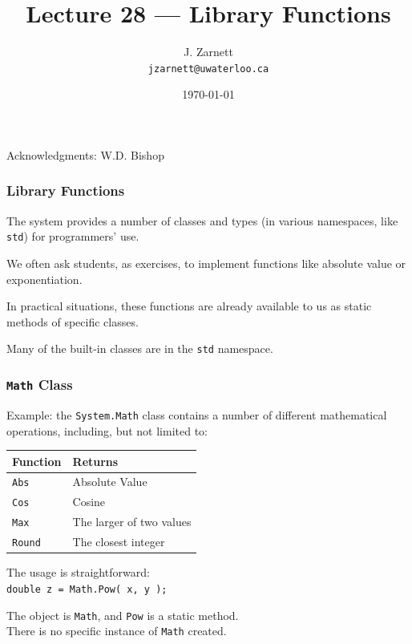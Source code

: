 

\title{Lecture 28 --- Library Functions }

\author{J. Zarnett\\
\texttt{jzarnett@uwaterloo.ca}}
\date{\today}



\begin{frame}
  \titlepage
  
  \begin{center}
  \small{Acknowledgments: W.D. Bishop}
  \end{center}
\end{frame}


\begin{frame}
\frametitle{Library Functions}
The system provides a number of classes and types (in various namespaces, like \texttt{std}) for programmers' use.

We often ask students, as exercises, to implement functions like absolute value or exponentiation.

In practical situations, these functions are already available to us as static methods of specific classes.

Many of the built-in classes are in the \texttt{std} namespace.

\end{frame}

\begin{frame}
\frametitle{\texttt{Math} Class}
Example: the \texttt{System.Math} class contains a number of different mathematical operations, including, but not limited to:

\begin{center}
\begin{tabular}{l l}
\textbf{Function} & \textbf{Returns}\\ \hline
\texttt{Abs} & Absolute Value\\
\texttt{Cos} & Cosine\\
\texttt{Max} & The larger of two values\\
\texttt{Round} & The closest integer\\
\end{tabular}
\end{center}

The usage is straightforward:\\
\quad \texttt{double z = Math.Pow( x, y );}

The object is \texttt{Math}, and \texttt{Pow} is a static method. \\
\quad There is no specific instance of \texttt{Math} created.

\end{frame}

